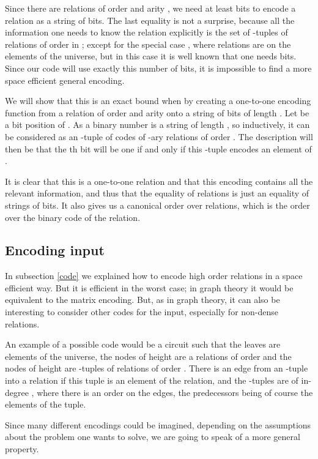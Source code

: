 \documentclass[a4paper,12pt]{article}
\theoremstyle{definition}
\begin{document}
Since there are  relations of order 
and arity , we need at least
 bits to encode a relation
 as a string of bits. The last equality is not a surprise,
because all the information one needs to know the relation 
explicitly is the set of -tuples of relations of order  in
; except for the special case , where relations are on
the elements of the universe, but in this case it is well known that
one needs  bits. Since our code will use exactly
this number of bits, it is impossible to find a more space efficient
general encoding.

We will show that this is an exact bound when  by creating a
one-to-one encoding function  from a relation of order  and
arity  onto a string of bits of length . Let
 be a bit position of . As a binary number  is a string
of length , so
inductively, it can be considered as an -tuple of codes of -ary
relations of order . The description will then be that the th
bit will be one if and only if this -tuple encodes an element of
.


It is clear that this is a one-to-one relation and that this encoding
contains all the relevant information, and thus that the equality of
relations is just an equality of strings of bits. It also gives us a
canonical order over relations, which is the order over the binary
code of the relation.



\subsection{Encoding input}\label{acc}
In subsection \ref{code} we explained how to encode high order
relations in a space efficient way. But it is efficient in the worst
case; in graph theory it would be equivalent to the matrix encoding.
But, as in graph theory, it can also be interesting to consider other
codes for the input, especially for non-dense relations.

An example of a possible code would be a circuit such that the leaves
are elements of the universe, the nodes of height  are a relations
of order  and the nodes of height  are -tuples of
relations of order . There is an edge from an -tuple into a
relation if this tuple is an element of the relation, and the
-tuples are of in-degree , where there is an order on the edges,
the  predecessors being of course the  elements of the tuple.

Since many different encodings could be imagined, depending on the
assumptions about the problem one wants to solve, we are going to
speak of a more general property.
\end{document}
